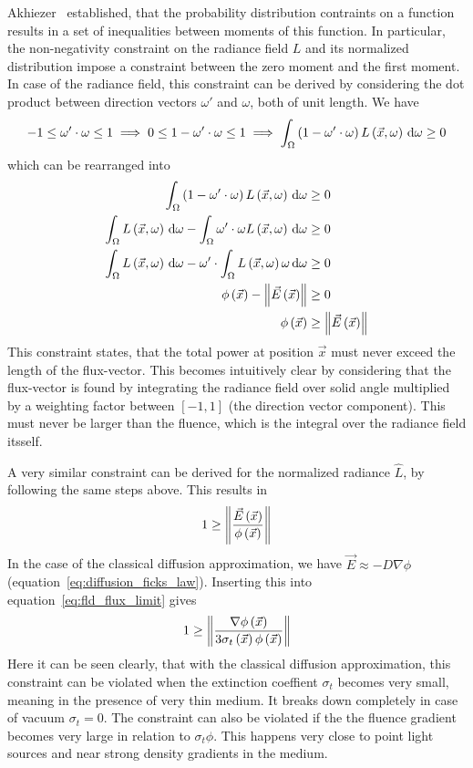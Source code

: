 Akhiezer~\cite{Akhiezer65} established, that the probability distribution contraints on a function results in a set of inequalities between moments of this function. In particular, the non-negativity constraint on the radiance field $L$ and its normalized distribution impose a constraint between the zero moment and the first moment. In case of the radiance field, this constraint can be derived by considering the dot product between direction vectors $\omega'$ and $\omega$, both of unit length. We have
\begin{align*}
-1 \le \omega'\cdot\omega \le 1
\implies
0 \le 1 - \omega'\cdot\omega \le 1
\implies
\int_{\Omega}{\left(1-\omega'\cdot\omega\right)L\left(\vec{x}, \omega\right)\,\mathrm{d}\omega}\ge 0
\end{align*}
which can be rearranged into
\begin{align*}
\int_{\Omega}{\left(1-\omega'\cdot\omega\right)L\left(\vec{x}, \omega\right)\,\mathrm{d}\omega} &\ge 0
\\
\int_{\Omega}{L\left(\vec{x}, \omega\right)\,\mathrm{d}\omega}
-\int_{\Omega}{\omega'\cdot\omega L\left(\vec{x}, \omega\right)\,\mathrm{d}\omega}
&\ge 0
\\
\int_{\Omega}{L\left(\vec{x}, \omega\right)\,\mathrm{d}\omega}
-\omega'\cdot\int_{\Omega}{L\left(\vec{x}, \omega\right)\omega\,\mathrm{d}\omega}
&\ge 0
\\
\phi\left(\vec{x}\right)
-\left\lVert\vec{E}\left(\vec{x}\right)\right\rVert
&\ge 0
\\
\phi\left(\vec{x}\right)
&\ge \left\lVert\vec{E}\left(\vec{x}\right)\right\rVert
\end{align*}
This constraint states, that the total power at position $\vec{x}$ must never exceed the length of the flux-vector. This becomes intuitively clear by considering that the flux-vector is found by integrating the radiance field over solid angle multiplied by a weighting factor between $\left[-1, 1\right]$ (the direction vector component). This must never be larger than the fluence, which is the integral over the radiance field itsself.

A very similar constraint can be derived for the normalized radiance $\widehat{L}$, by following the same steps above. This results in
\begin{align}
\label{eq:fld_flux_limit}
1
\ge
\left\lVert
\frac{\vec{E}\left(\vec{x}\right)}{\phi\left(\vec{x}\right)}
\right\rVert
\end{align}
In the case of the classical diffusion approximation, we have $\vec{E}\approx-D\nabla\phi$ (equation~\ref{eq:diffusion_ficks_law}). Inserting this into equation~\ref{eq:fld_flux_limit} gives
\begin{align}
\label{eq:fld_flux_limit}
1
\ge
\left\lVert
\frac{\nabla\phi\left(\vec{x}\right)}{3\sigma_t\left(\vec{x}\right)\phi\left(\vec{x}\right)}
\right\rVert
\end{align}
Here it can be seen clearly, that with the classical diffusion approximation, this constraint can be violated when the extinction coeffient $\sigma_t$ becomes very small, meaning in the presence of very thin medium. It breaks down completely in case of vacuum $\sigma_t=0$. The constraint can also be violated if the the fluence gradient becomes very large in relation to $\sigma_t\phi$. This happens very close to point light sources and near strong density gradients in the medium.

